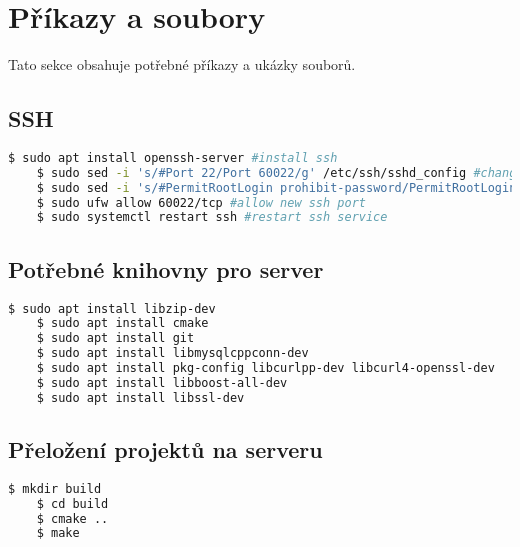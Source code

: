 \chapter{Příkazy a soubory}\label{att:server_install}
Tato sekce obsahuje potřebné příkazy a ukázky souborů.


\section{SSH}\label{att:ssh}
\begin{lstlisting}[language=bash,breaklines]
    $ sudo apt install openssh-server #install ssh
    $ sudo sed -i 's/#Port 22/Port 60022/g' /etc/ssh/sshd_config #change ssh port
    $ sudo sed -i 's/#PermitRootLogin prohibit-password/PermitRootLogin no/g' /etc/ssh/sshd_config #disable root login
    $ sudo ufw allow 60022/tcp #allow new ssh port
    $ sudo systemctl restart ssh #restart ssh service
\end{lstlisting}

\section{Potřebné knihovny pro server}\label{att:server_libs}
\begin{lstlisting}[language=bash,breaklines]
    $ sudo apt install libzip-dev
    $ sudo apt install cmake
    $ sudo apt install git
    $ sudo apt install libmysqlcppconn-dev
    $ sudo apt install pkg-config libcurlpp-dev libcurl4-openssl-dev
    $ sudo apt install libboost-all-dev
    $ sudo apt install libssl-dev
\end{lstlisting}

\section{Přeložení projektů na serveru}\label{att:compile}
\begin{lstlisting}[language=bash,breaklines]
    $ mkdir build
    $ cd build
    $ cmake ..
    $ make
\end{lstlisting}


